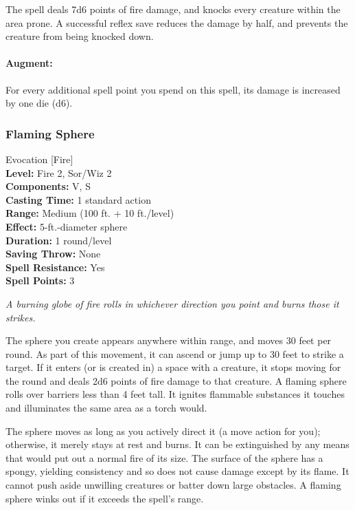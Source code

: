 The spell deals 7d6 points of fire damage, and knocks every creature within the area prone.
A successful reflex save reduces the damage by half, and prevents the creature from being knocked down.

\paragraph{Augment:} For every additional spell point you spend on this spell, its damage is increased by one die (d6).
\subsubsection{Flaming Sphere}
\label{Spell:FlamingSphere}
Evocation [Fire]
\\ \textbf{Level:} Fire 2, Sor/Wiz 2
\\ \textbf{Components:} V, S
\\ \textbf{Casting Time:} 1 standard action
\\ \textbf{Range:} Medium (100 ft. + 10 ft./level)
\\ \textbf{Effect:} 5-ft.-diameter sphere
\\ \textbf{Duration:} 1 round/level
\\ \textbf{Saving Throw:} None
\\ \textbf{Spell Resistance:} Yes
\\ \textbf{Spell Points:} 3

\emph{A burning globe of fire rolls in whichever direction you point and burns those it strikes.} 

The sphere you create appears anywhere within range, and moves 30 feet per round. As part of this movement, it can ascend or jump up to 30 feet to strike a target. 
If it enters (or is created in) a space with a creature, it stops moving for the round and deals 2d6 points of fire damage to that creature.
A flaming sphere rolls over barriers less than 4 feet tall. 
It ignites flammable substances it touches and illuminates the same area as a torch would.

The sphere moves as long as you actively direct it (a move action for you); 
otherwise, it merely stays at rest and burns. It can be extinguished by any means that would put out a normal fire of its size. 
The surface of the sphere has a spongy, yielding consistency and so does not cause damage except by its flame. 
It cannot push aside unwilling creatures or batter down large obstacles. 
A flaming sphere winks out if it exceeds the spell's range.

